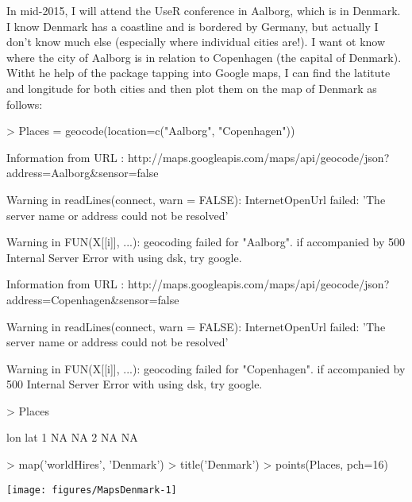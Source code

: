 In mid-2015, I will attend the UseR conference in Aalborg, which is in Denmark. I know Denmark has a coastline and is bordered by Germany, but actually I don't know much else (especially where individual cities are!). I want ot know where the city of Aalborg is in relation to Copenhagen (the capital of Denmark). Witht he help of the  package tapping into Google maps, I can find the latitute and longitude for both cities and then plot them on the map of Denmark as follows: 
\begin{Schunk}
\begin{Sinput}
> Places = geocode(location=c("Aalborg", "Copenhagen")) 
\end{Sinput}
\begin{Soutput}
Information from URL : http://maps.googleapis.com/maps/api/geocode/json?address=Aalborg&sensor=false
\end{Soutput}
\begin{Soutput}
Warning in readLines(connect, warn = FALSE): InternetOpenUrl failed: 'The server name or address could not be resolved'
\end{Soutput}
\begin{Soutput}
Warning in FUN(X[[i]], ...):   geocoding failed for "Aalborg".
  if accompanied by 500 Internal Server Error with using dsk, try google.
\end{Soutput}
\begin{Soutput}
Information from URL : http://maps.googleapis.com/maps/api/geocode/json?address=Copenhagen&sensor=false
\end{Soutput}
\begin{Soutput}
Warning in readLines(connect, warn = FALSE): InternetOpenUrl failed: 'The server name or address could not be resolved'
\end{Soutput}
\begin{Soutput}
Warning in FUN(X[[i]], ...):   geocoding failed for "Copenhagen".
  if accompanied by 500 Internal Server Error with using dsk, try google.
\end{Soutput}
\begin{Sinput}
> Places 
\end{Sinput}
\begin{Soutput}
  lon lat
1  NA  NA
2  NA  NA
\end{Soutput}
\begin{Sinput}
> map('worldHires', 'Denmark') 
> title('Denmark') 
> points(Places, pch=16) 
\end{Sinput}

\texttt{[image: figures/MapsDenmark-1]} \end{Schunk}

